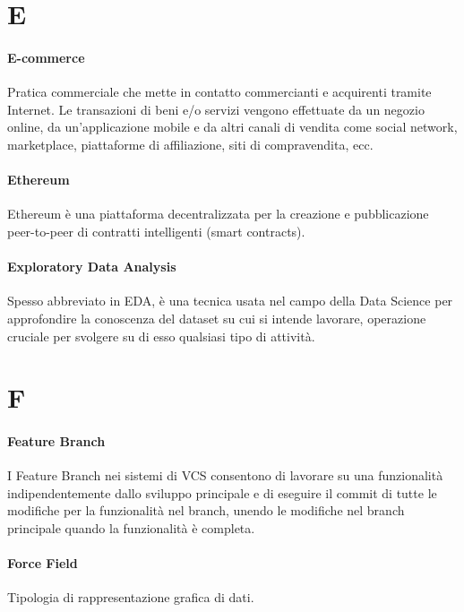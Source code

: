 \documentclass[]{article}
\begin{document}
	\newpage
	
	\section*{E}
	
	\paragraph*{E-commerce}
	Pratica commerciale che mette in contatto commercianti e acquirenti tramite Internet. Le transazioni di beni e/o servizi vengono effettuate da un negozio online, da un'applicazione mobile e da altri canali di vendita come social network, marketplace, piattaforme di affiliazione, siti di compravendita, ecc.
	
	\paragraph*{Ethereum}
	Ethereum è una piattaforma decentralizzata per la creazione e pubblicazione peer-to-peer di contratti intelligenti (smart contracts).
	
	\paragraph*{Exploratory Data Analysis}
	Spesso abbreviato in EDA, è una tecnica usata nel campo della Data Science per approfondire la conoscenza del dataset su cui si intende lavorare, operazione cruciale per svolgere su di esso qualsiasi tipo di attività.
	
	\newpage
	
	\section*{F}
	
	\paragraph*{Feature Branch}
	I Feature Branch nei sistemi di VCS consentono di lavorare su una funzionalità indipendentemente dallo sviluppo principale e di eseguire il commit di tutte le modifiche per la funzionalità nel branch, unendo le modifiche nel branch principale quando la funzionalità è completa.
	
	\paragraph*{Force Field}
	Tipologia di rappresentazione grafica di dati.
	
\end{document}
